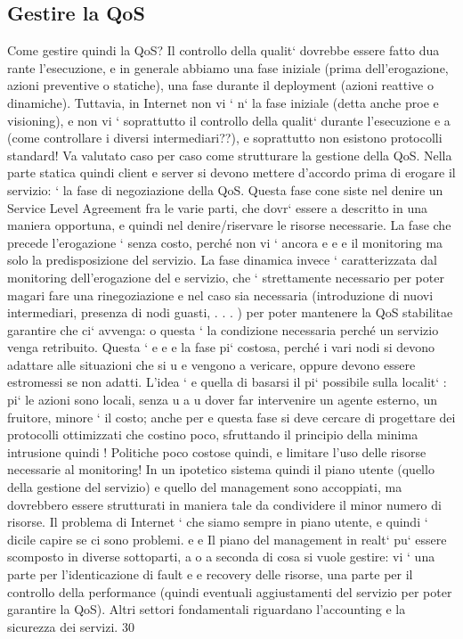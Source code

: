 \documentclass[a4paper,12pt]{article}
\begin{document}
\subsection{Gestire la QoS}
Come gestire quindi la QoS? Il controllo della qualit` dovrebbe essere fatto dua
rante l'esecuzione, e in generale abbiamo una fase iniziale (prima dell'erogazione,
azioni preventive o statiche), una fase durante il deployment (azioni reattive o
dinamiche). Tuttavia, in Internet non vi ` n` la fase iniziale (detta anche proe e
visioning), e non vi ` soprattutto il controllo della qualit` durante l'esecuzione
e
a
(come controllare i diversi intermediari??), e soprattutto non esistono protocolli
standard! Va valutato caso per caso come strutturare la gestione della QoS.
Nella parte statica quindi client e server si devono mettere d'accordo prima
di erogare il servizio: ` la fase di negoziazione della QoS. Questa fase cone
siste nel denire un Service Level Agreement fra le varie parti, che dovr` essere
a
descritto in una maniera opportuna, e quindi nel denire/riservare le risorse necessarie. La fase che precede
l'erogazione ` senza costo, perché non vi ` ancora
e
e
e
il monitoring ma solo la predisposizione del servizio.
La fase dinamica invece ` caratterizzata dal monitoring dell'erogazione del
e
servizio, che ` strettamente necessario per poter magari fare una rinegoziazione
e
nel caso sia necessaria (introduzione di nuovi intermediari, presenza di nodi
guasti, . . . ) per poter mantenere la QoS stabilitae garantire che ci` avvenga:
o
questa ` la condizione necessaria perché un servizio venga retribuito. Questa `
e
e
e
la fase pi` costosa, perché i vari nodi si devono adattare alle situazioni che si
u
e
vengono a vericare, oppure devono essere estromessi se non adatti. L'idea `
e
quella di basarsi il pi` possibile sulla localit` : pi` le azioni sono locali, senza
u
a
u
dover far intervenire un agente esterno, un fruitore, minore ` il costo; anche per
e
questa fase si deve cercare di progettare dei protocolli ottimizzati che costino
poco, sfruttando il principio della minima intrusione quindi ! Politiche poco
costose quindi, e limitare l'uso delle risorse necessarie al monitoring! In un
ipotetico sistema quindi il piano utente (quello della gestione del servizio) e
quello del management sono accoppiati, ma dovrebbero essere strutturati in
maniera tale da condividere il minor numero di risorse. Il problema di Internet
` che siamo sempre in piano utente, e quindi ` dicile capire se ci sono problemi.
e
e
Il piano del management in realt` pu` essere scomposto in diverse sottoparti,
a o
a seconda di cosa si vuole gestire: vi ` una parte per l'identicazione di fault
e
e recovery delle risorse, una parte per il controllo della performance (quindi
eventuali aggiustamenti del servizio per poter garantire la QoS). Altri settori
fondamentali riguardano l'accounting e la sicurezza dei servizi.
30
\end{document}

